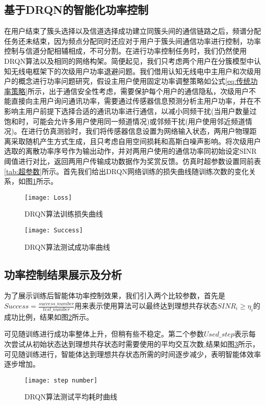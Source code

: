 \subsection{基于DRQN的智能化功率控制}
在用户结束了簇头选择以及信道选择成功建立同簇头间的通信链路之后，频谱分配任务还未结束，因为频点分配同时还应对于用户于簇头间通信功率进行控制，功率控制与信道分配相辅相成，不可分割。在进行功率控制任务时，我们仍然使用DRQN算法以及相同的网络构架。简便起见，我们只考虑两个用户在分簇模型中认知无线电框架下的次级用户功率退避问题。我们借用认知无线电中主用户和次级用户的概念进行功率问题研究，假设主用户使用固定功率调整策略如公式\ref{eq:传统功率策略}所示，出于通信安全性考虑，需要保护每个用户的通信隐私，次级用户不能直接向主用户询问通讯功率，需要通过传感器信息预测分析主用户功率，并在不影响主用户前提下选择合适的通讯功率进行通信，以减小同频干扰(当用户数量过饱和时，可能会允许多用户使用同一频道情况)或邻频干扰(用户使用邻近频道情况)。在进行仿真测验时，我们将传感器信息设置为网络输入状态，两用户物理距离采取随机产生方式生成，且只考虑自用空间损耗和高斯白噪声影响。将次级用户选取的离散功率序号作为输出动作，并对两用户使用的通信功率同初始设定SINR阈值进行对比，返回两用户传输成功数据作为奖赏反馈。仿真时超参数设置同前表\ref{tab:超参数}所示。首先我们给出DRQN网络训练的损失曲线随训练次数的变化关系，如图\ref{fig:功率loss}所示。

\begin{figure}[htbp]
	\centering
	\texttt{[image: Loss]}
	\caption{DRQN算法训练损失曲线}
	\label{fig:功率loss}
\end{figure}

\begin{figure}[htbp]
	\centering
	\texttt{[image: Success]}
	\caption{DRQN算法测试成功率曲线}
	\label{fig:功率success}
\end{figure}
\subsection{功率控制结果展示及分析}
为了展示训练后智能体功率控制效果，我们引入两个比较参数，首先是$Success=\frac{success\_number}{test\_number}$用来表示使用算法可以最终达到理想共存状态$SINR_{i}\geqslant\eta_{i}$的成功比例，结果如图\ref{fig:功率success}所示。

可见随训练进行成功率整体上升，但稍有些不稳定。第二个参数$Used\_step$表示每次尝试从初始状态达到理想共存状态时需要使用的平均交互次数,结果如图\ref{fig:功率step}所示，可见随训练进行，智能体达到理想共存状态所需的时间逐步减少，表明智能体效率逐步增加。
\begin{figure}[htbp]
	\centering
	\texttt{[image: step number]}
	\caption{DRQN算法测试平均耗时曲线}
	\label{fig:功率step}
\end{figure}

